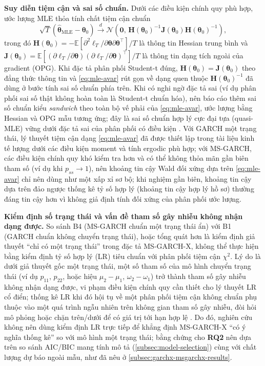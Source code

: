 \documentclass[12pt,a4paper]{article}
\numberwithin{equation}{section}
\newcommand{\bm}[1]{\symbf{#1}}
\newcommand{\Param}{\bm{\theta}}
\newcommand{\E}{\mathbb{E}}
\newcommand{\RQ}[1]{\textbf{RQ#1}}
\begin{document}
\textbf{Suy diễn tiệm cận và sai số chuẩn.}
Dưới các điều kiện chính quy phù hợp, ước lượng MLE thỏa tính chất tiệm cận chuẩn
\begin{equation}
  \sqrt{T}\left(\widehat{\Param}_{\mathrm{MLE}}-\Param_0\right)
  \xrightarrow{d}
  \mathcal{N}\!\left(\bm 0,\, \bm H(\Param_0)^{-1}\bm J(\Param_0)\bm H(\Param_0)^{-1}\right),
  \label{eq:mle-avar}
\end{equation}
trong đó $\bm H(\Param_0)=-\E\!\left[\partial^2\ell_T/\partial\Param\partial\Param^{\top}\right]/T$ là thông tin Hessian trung bình và $\bm J(\Param_0)=\E\!\left[(\partial\ell_T/\partial\Param)(\partial\ell_T/\partial\Param)^{\top}\right]/T$ là thông tin dạng tích ngoài của gradient (OPG). Khi đặc tả phân phối Student-t đúng, $\bm H(\Param_0)=\bm J(\Param_0)$ theo đẳng thức thông tin và \cref{eq:mle-avar} rút gọn về dạng quen thuộc $\bm H(\Param_0)^{-1}$ đã dùng ở bước tính sai số chuẩn phía trên. Khi có nghi ngờ đặc tả sai (ví dụ phân phối sai số thật không hoàn toàn là Student-t chuẩn hóa), nên báo cáo thêm sai số chuẩn kiểu \emph{sandwich} theo toàn bộ vế phải của \cref{eq:mle-avar}, ước lượng bằng Hessian và OPG mẫu tương ứng; đây là sai số chuẩn hợp lý cực đại tựa (quasi-MLE) vững dưới đặc tả sai của phân phối có điều kiện \cite{bollerslev1992}. Với GARCH một trạng thái, lý thuyết tiệm cận dạng \cref{eq:mle-avar} đã được thiết lập trong tài liệu kinh tế lượng dưới các điều kiện moment và tính ergodic phù hợp; với MS-GARCH, các điều kiện chính quy khó kiểm tra hơn và có thể không thỏa mãn gần biên tham số (ví dụ khi $p_{ss}\to 1$), nên khoảng tin cậy Wald đối xứng dựa trên \cref{eq:mle-avar} chỉ nên dùng như một xấp xỉ sơ bộ; khi nghiệm gần biên, khoảng tin cậy dựa trên đảo ngược thống kê tỷ số hợp lý (khoảng tin cậy hợp lý hồ sơ) thường đáng tin cậy hơn vì không giả định tính đối xứng của phân phối ước lượng.

\textbf{Kiểm định số trạng thái và vấn đề tham số gây nhiễu không nhận dạng được.}
So sánh B4 (MS-GARCH chuẩn một trạng thái ẩn) với B1 (GARCH chuẩn không chuyển trạng thái), hoặc tổng quát hơn là kiểm định giả thuyết ``chỉ có một trạng thái'' trong đặc tả MS-GARCH-X, không thể thực hiện bằng kiểm định tỷ số hợp lý (LR) tiêu chuẩn với phân phối tiệm cận $\chi^2$. Lý do là dưới giả thuyết gốc một trạng thái, một số tham số của mô hình chuyển trạng thái (ví dụ $p_{11}$, $p_{22}$, hoặc hiệu $\mu_2-\mu_1$, $\omega_2-\omega_1$) trở thành tham số gây nhiễu không nhận dạng được, vi phạm điều kiện chính quy cần thiết cho lý thuyết LR cổ điển; thống kê LR khi đó hội tụ về một phân phối tiệm cận không chuẩn phụ thuộc vào một quá trình ngẫu nhiên trên không gian tham số gây nhiễu, đòi hỏi mô phỏng hoặc chặn trên/dưới để có giá trị tới hạn hợp lệ \cite{hansen1992}. Do đó, nghiên cứu không nên dùng kiểm định LR trực tiếp để khẳng định MS-GARCH-X ``có ý nghĩa thống kê'' so với mô hình một trạng thái; bằng chứng cho \RQ{2} nên dựa trên so sánh AIC/BIC mang tính mô tả (\cref{subsec:model-selection}) cùng với chất lượng dự báo ngoài mẫu, như đã nêu ở \cref{subsec:garchx-msgarchx-results}.
\end{document}
